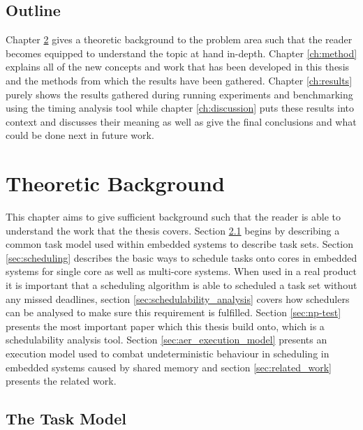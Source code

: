 \documentclass{kththesis}
\begin{document}
\section{Outline}

Chapter \ref{ch:theoretic_background} gives a theoretic background to the problem area such that the
reader becomes equipped to understand the topic at hand in-depth. Chapter \ref{ch:method} explains
all of the new concepts and work that has been developed in this thesis and the methods from which
the results have been gathered. Chapter \ref{ch:results} purely shows the results gathered during
running experiments and benchmarking using the timing analysis tool while chapter \ref{ch:discussion}
puts these results into context and discusses their meaning as well as give the final conclusions and
what could be done next in future work.


\chapter{Theoretic Background}\label{ch:theoretic_background}

This chapter aims to give sufficient background such that the reader is able to understand the work
that the thesis covers. Section \ref{sec:the_task_model} begins by describing a common task model
used within embedded systems to describe task sets. Section \ref{sec:scheduling} describes the basic
ways to schedule tasks onto cores in embedded systems for single core as well as multi-core systems.
When used in a real product it is important that a scheduling algorithm is able to scheduled a task
set without any missed deadlines, section \ref{sec:schedulability_analysis} covers how schedulers
can be analysed to make sure this requirement is fulfilled. Section \ref{sec:np-test} presents the
most important paper which this thesis build onto, which is a schedulability analysis tool. Section
\ref{sec:aer_execution_model} presents an execution model used to combat undeterministic behaviour
in scheduling in embedded systems caused by shared memory and section \ref{sec:related_work}
presents the related work.


\section{The Task Model} \label{sec:the_task_model}
\end{document}
